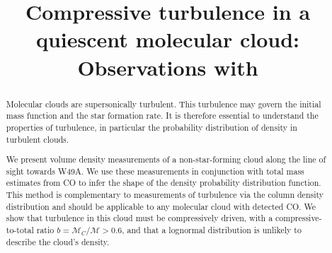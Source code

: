 \title{Compressive turbulence in a quiescent molecular cloud: Observations with
\formaldehyde}
\begin{abstract}
    Molecular clouds are supersonically turbulent.  This turbulence may govern
    the initial mass function and the star formation rate.  It is therefore
    essential to understand the properties of turbulence, in particular the
    probability distribution of density in turbulent clouds.

    We present \formaldehyde volume density measurements of a non-star-forming
    cloud along the line of sight towards W49A. We use these measurements in
    conjunction with total mass estimates from CO to infer the shape of the
    density probability distribution function.  This method is complementary to
    measurements of turbulence via the column density distribution and should
    be applicable to any molecular cloud with detected CO.  We show that
    turbulence in this cloud must be compressively driven, with a
    compressive-to-total ratio $b = \mathcal{M}_C/\mathcal{M}>0.6$, and that a
    lognormal distribution is unlikely to describe the cloud's density.  



\end{abstract}
